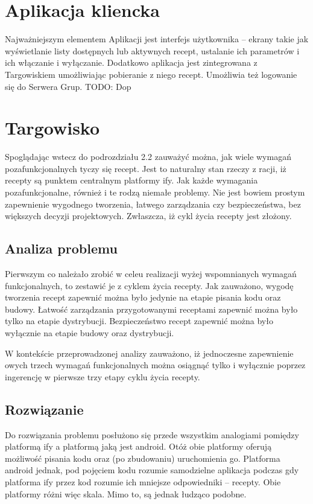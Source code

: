 \documentclass[11pt,a4paper,polish,thesis]{dcsbook}
\begin{document}
\section{Aplikacja kliencka}
Najważniejszym elementem Aplikacji jest interfejs użytkownika -- ekrany takie jak wyświetlanie listy dostępnych lub aktywnych recept, ustalanie ich parametrów i ich włączanie i wyłączanie. Dodatkowo aplikacja jest zintegrowana z Targowiskiem umożliwiając pobieranie z niego recept. Umożliwia też logowanie się do Serwera Grup.
TODO: Dop
\section{Targowisko}
Spoglądając wstecz do podrozdziału 2.2 zauważyć można, jak wiele wymagań pozafunkcjonalnych tyczy się recept. Jest to naturalny stan rzeczy z racji, iż recepty są
punktem centralnym platformy if{y}. Jak każde wymagania pozafunkcjonalne, również i te rodzą niemałe problemy. Nie jest bowiem prostym zapewnienie wygodnego tworzenia,
łatwego zarządzania czy bezpieczeństwa, bez większych decyzji projektowych. Zwłaszcza, iż cykl życia recepty jest złożony.
\subsection{Analiza problemu}
Pierwszym co należało zrobić w celeu realizacji wyżej wspomnianych wymagań funkcjonalnych, to zestawić je z cyklem życia recepty. Jak zauważono, wygodę tworzenia
recept zapewnić można było jedynie na etapie pisania kodu oraz budowy. Łatwość zarządzania przygotowanymi receptami zapewnić można było tylko na etapie dystrybucji.
Bezpieczeństwo recept zapewnić można było wyłącznie na etapie budowy oraz dystrybucji.

W kontekście przeprowadzonej analizy zauważono, iż jednoczesne zapewnienie owych trzech wymagań funkcjonalnych można osiągnąć tylko i wyłącznie poprzez ingerencję w
pierwsze trzy etapy cyklu życia recepty.
\subsection{Rozwiązanie}
Do rozwiązania problemu posłużono się przede wszystkim analogiami pomiędzy platformą if{y} a platformą jaką jest android. Otóż obie platformy oferują możliwość
pisania kodu oraz (po zbudowaniu) uruchomienia go. Platforma android jednak, pod pojęciem kodu rozumie samodzielne aplikacja podczas gdy platforma if{y} przez kod
rozumie ich mniejsze odpowiedniki -- recepty. Obie platformy różni więc skala. Mimo to, są jednak łudząco podobne.
\end{document}
